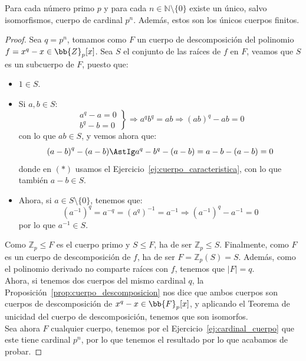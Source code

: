 \begin{teo}
    Para cada número primo $p$ y para cada $n\in \mathbb{N}\setminus\{0\}$ existe un único, salvo isomorfismos, cuerpo de cardinal $p^n$. Además, estos son los únicos cuerpos finitos.
    \begin{proof}
        Sea $q=p^n$, tomamos como $F$ un cuerpo de descomposición del polinomio $f=x^q-x\in \bb{Z}_p[x]$. Sea $S$ el conjunto de las raíces de $f$ en $F$, veamos que $S$ es un subcuerpo de $F$, puesto que:
        \begin{itemize}
            \item $1\in S$.
            \item Si $a,b\in S$:
                \begin{equation*}
                    \left.\begin{array}{l}
                        a^q - a = 0 \\
                        b^q - b = 0 
                    \end{array}\right\} \Longrightarrow a^qb^q = ab \Longrightarrow {(ab)}^{q}-ab = 0
                \end{equation*}
                con lo que $ab\in S$, y vemos ahora que:
                \begin{equation*}
                    {(a-b)}^{q}-(a-b) \AstIg a^q - b^q - (a-b) = a-b-(a-b) = 0
                \end{equation*}
                donde en $(\ast)$ usamos el Ejercicio~\ref{ej:cuerpo_caracteristica}, con lo que también $a-b\in S$.
            \item Ahora, si $a\in S\setminus\{0\}$, tenemos que:
                \begin{equation*}
                    {(a^{-1})}^{q} = a^{-q} = {(a^{q})}^{-1} = a^{-1} \Longrightarrow {(a^{-1})}^{q}-a^{-1} = 0
                \end{equation*}
                por lo que $a^{-1}\in S$.
        \end{itemize}
        Como $\mathbb{Z}_p\leq F$ es el cuerpo primo y $S\leq F$, ha de ser $\mathbb{Z}_p\leq S$. Finalmente, como $F$ es un cuerpo de descomposición de $f$, ha de ser $F=\mathbb{Z}_p(S) =S$. Además, como el polinomio derivado no comparte raíces con $f$, tenemos que $|F| = q$.\\

        \noindent
    Ahora, si tenemos dos cuerpos del mismo cardinal $q$, la Proposición~\ref{prop:cuerpo_descomposicion} nos dice que ambos cuerpos son cuerpos de descomposición de $x^q-x\in \bb{F}_p[x]$, y aplicando el Teorema de unicidad del cuerpo de descomposición, tenemos que son isomorfos.\\

    \noindent
    Sea ahora $F$ cualquier cuerpo, tenemos por el Ejercicio~\ref{ej:cardinal_cuerpo} que este tiene cardinal $p^n$, por lo que tenemos el resultado por lo que acabamos de probar.
    \end{proof}
\end{teo}

